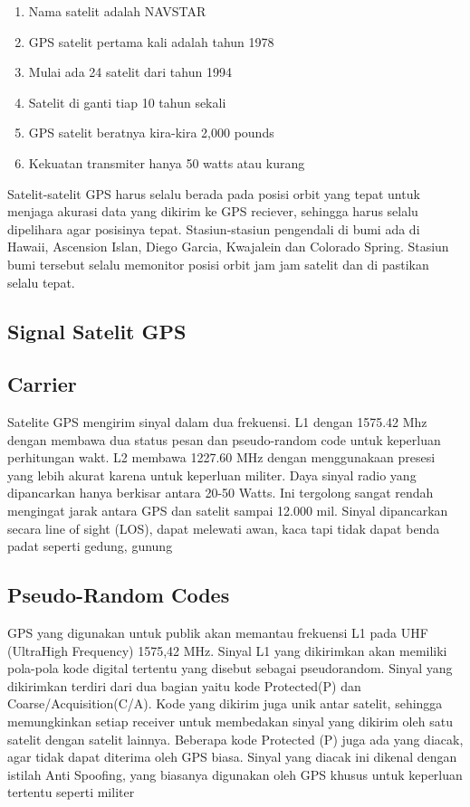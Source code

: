 \begin{enumerate}
	\item Nama satelit adalah NAVSTAR
	\item GPS satelit pertama kali adalah tahun 1978
	\item Mulai ada 24 satelit dari tahun 1994
	\item Satelit di ganti tiap 10 tahun sekali
	\item GPS satelit beratnya kira-kira 2,000 pounds
	\item Kekuatan transmiter hanya 50 watts atau kurang
\end{enumerate}

Satelit-satelit GPS harus selalu berada pada posisi orbit yang tepat untuk menjaga akurasi data yang dikirim ke GPS reciever, sehingga harus selalu dipelihara agar posisinya tepat. Stasiun-stasiun pengendali di bumi ada di Hawaii, Ascension Islan, Diego Garcia, Kwajalein dan Colorado Spring. Stasiun bumi tersebut selalu memonitor posisi orbit jam jam satelit dan di pastikan selalu tepat.


\subsection{Signal Satelit GPS}
\subsection{Carrier}
Satelite GPS mengirim sinyal dalam dua frekuensi. L1 dengan 1575.42 Mhz dengan membawa dua status pesan dan pseudo-random code untuk keperluan perhitungan wakt. L2 membawa 1227.60 MHz dengan menggunakaan presesi yang lebih akurat karena untuk keperluan militer. 
Daya sinyal radio yang dipancarkan hanya berkisar antara 20-50 Watts. Ini tergolong sangat rendah mengingat jarak antara GPS dan satelit sampai 12.000 mil. Sinyal dipancarkan secara line of sight (LOS), dapat melewati awan, kaca tapi tidak dapat benda padat seperti gedung, gunung

\subsection{Pseudo-Random Codes}
GPS yang digunakan untuk publik akan memantau frekuensi L1 pada UHF (UltraHigh Frequency) 1575,42 MHz. Sinyal L1 yang dikirimkan akan memiliki pola-pola kode digital tertentu yang disebut sebagai pseudorandom. Sinyal yang dikirimkan terdiri dari dua bagian yaitu kode Protected(P) dan Coarse/Acquisition(C/A). Kode yang dikirim juga unik antar satelit, sehingga memungkinkan setiap receiver untuk membedakan sinyal yang dikirim oleh satu satelit dengan satelit lainnya. Beberapa kode Protected (P) juga ada yang diacak, agar tidak dapat diterima oleh GPS biasa. Sinyal yang diacak ini dikenal dengan istilah Anti Spoofing, yang biasanya digunakan oleh GPS khusus untuk keperluan tertentu seperti militer

